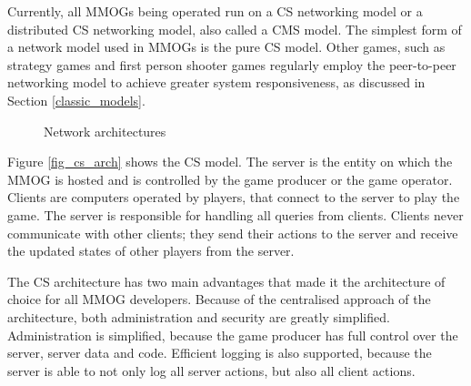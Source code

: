 \documentclass[journal,oneside,a4paper,onecolumn]{IEEEtran}
\begin{document}
Currently, all MMOGs being operated run on a \ac{CS} networking model or a distributed \ac{CS} networking model, also called a \ac{CMS} model. The simplest form of a network model used in MMOGs is the pure \ac{CS} model. Other games, such as strategy games and first person shooter games regularly employ the peer-to-peer networking model to achieve greater system responsiveness, as discussed in Section \ref{classic_models}.

\begin{figure}[htbp]
\centering
\caption{Network architectures}
\end{figure}
%
Figure \ref{fig_cs_arch} shows the \ac{CS} model. The server is the entity on which the MMOG is hosted and is controlled by the game producer or the game operator. Clients are computers operated by players, that connect to the server to play the game. The server is responsible for handling all queries from clients. Clients never communicate with other clients; they send their actions to the server and receive the updated states of other players from the server.

The \ac{CS} architecture has two main advantages that made it the architecture of choice for all MMOG developers. Because of the centralised approach of the architecture, both administration and security are greatly simplified. Administration is simplified, because the game producer has full control over the server, server data and code. Efficient logging is also supported, because the server is able to not only log all server actions, but also all client actions.
\end{document}
